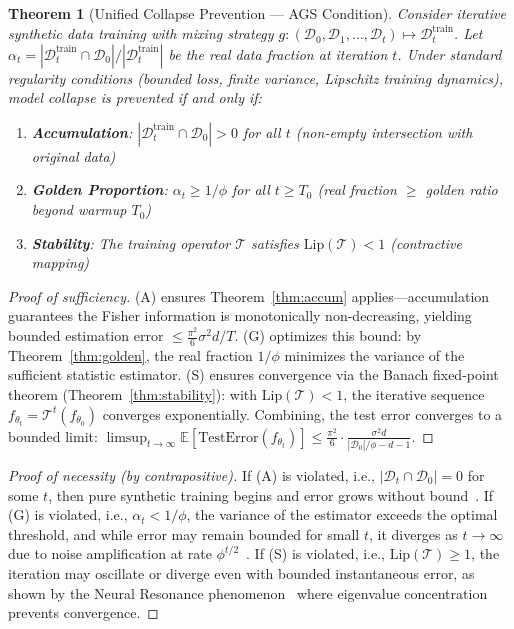 \documentclass[11pt]{article}
\newtheorem{theorem}{Theorem}
\newcommand{\varph}{\phi}
\newcommand{\E}{\mathbb{E}}
\newcommand{\cD}{\mathcal{D}}
\begin{document}
\begin{theorem}[Unified Collapse Prevention --- AGS Condition]
\label{thm:ags}
Consider iterative synthetic data training with mixing strategy $g: (\cD_0, \cD_1, \ldots, \cD_t) \mapsto \cD_t^{\mathrm{train}}$. Let $\alpha_t = |\cD_t^{\mathrm{train}} \cap \cD_0|/|\cD_t^{\mathrm{train}}|$ be the real data fraction at iteration $t$. Under standard regularity conditions (bounded loss, finite variance, Lipschitz training dynamics), model collapse is prevented if and only if:
\begin{enumerate}[nosep]
    \item[\textbf{(A)}] \textbf{Accumulation}: $|\cD_t^{\mathrm{train}} \cap \cD_0| > 0$ for all $t$ \quad (non-empty intersection with original data)
    \item[\textbf{(G)}] \textbf{Golden Proportion}: $\alpha_t \geq 1/\varph$ for all $t \geq T_0$ \quad (real fraction $\geq$ golden ratio beyond warmup $T_0$)
    \item[\textbf{(S)}] \textbf{Stability}: The training operator $\mathcal{T}$ satisfies $\mathrm{Lip}(\mathcal{T}) < 1$ \quad (contractive mapping)
\end{enumerate}
\end{theorem}

\begin{proof}[Proof of sufficiency]
(A) ensures Theorem~\ref{thm:accum} applies---accumulation guarantees the Fisher information is monotonically non-decreasing, yielding bounded estimation error $\leq \frac{\pi^2}{6}\sigma^2 d / T$. (G) optimizes this bound: by Theorem~\ref{thm:golden}, the real fraction $1/\varph$ minimizes the variance of the sufficient statistic estimator. (S) ensures convergence via the Banach fixed-point theorem (Theorem~\ref{thm:stability}): with $\mathrm{Lip}(\mathcal{T}) < 1$, the iterative sequence $f_{\theta_t} = \mathcal{T}^t(f_{\theta_0})$ converges exponentially. Combining, the test error converges to a bounded limit: $\limsup_{t \to \infty} \E[\mathrm{TestError}(f_{\theta_t})] \leq \frac{\pi^2}{6} \cdot \frac{\sigma^2 d}{|\cD_0|/\varph - d - 1}$.
\end{proof}

\begin{proof}[Proof of necessity (by contrapositive)]
If (A) is violated, i.e., $|\cD_t \cap \cD_0| = 0$ for some $t$, then pure synthetic training begins and error grows without bound~\citep{gerstgrasser2024model,shumailov2023curse}. If (G) is violated, i.e., $\alpha_t < 1/\varph$, the variance of the estimator exceeds the optimal threshold, and while error may remain bounded for small $t$, it diverges as $t \to \infty$ due to noise amplification at rate $\varph^{t/2}$~\citep{dohmatob2024strong}. If (S) is violated, i.e., $\mathrm{Lip}(\mathcal{T}) \geq 1$, the iteration may oscillate or diverge even with bounded instantaneous error, as shown by the Neural Resonance phenomenon~\citep{neural2026resonance} where eigenvalue concentration prevents convergence.
\end{proof}
\end{document}
